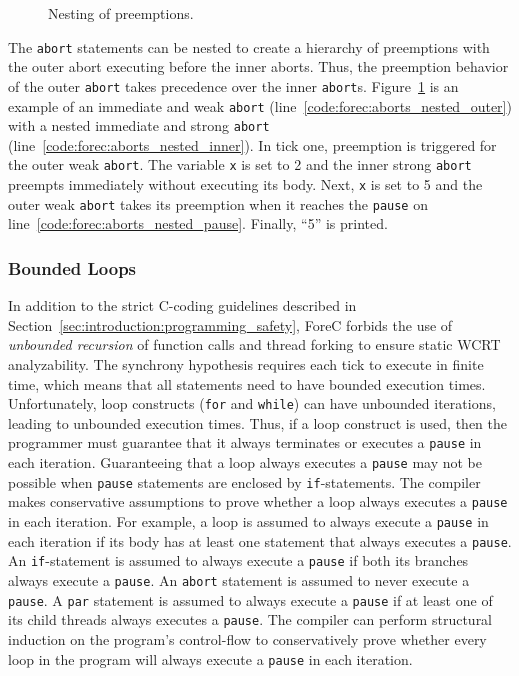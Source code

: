 \begin{figure}
	\centering

	\begin{minipage}[t]{0.65\columnwidth}
		
	\end{minipage}

	\caption{Nesting of preemptions.}
	\label{fig:forec:aborts_nested}
\end{figure}

The \verb$abort$ statements can be nested to create 
a hierarchy of preemptions with the outer abort executing 
before the inner aborts. Thus, the preemption 
behavior of the outer \verb$abort$ takes precedence 
over the inner \verb$abort$s. Figure~\ref{fig:forec:aborts_nested}
is an example of an immediate and weak
\verb$abort$ (line~\ref{code:forec:aborts_nested_outer}) 
with a nested immediate and strong \verb$abort$
(line~\ref{code:forec:aborts_nested_inner}).
In tick one, preemption is triggered for the outer
weak \verb$abort$. The variable \verb$x$ is set to 2
and the inner strong \verb$abort$ preempts
immediately without executing its body. Next, \verb$x$ is set to 5 and the 
outer weak \verb$abort$ takes its preemption when 
it reaches the \verb$pause$ on line~\ref{code:forec:aborts_nested_pause}. 
Finally, ``5'' is printed.



\subsubsection{Bounded Loops}
\label{sec:forec:programming}
In addition to the strict C-coding guidelines described in 
Section~\ref{sec:introduction:programming_safety}, 
ForeC forbids the use of \emph{unbounded recursion} of function calls and 
thread forking to ensure static WCRT analyzability. 
The synchrony hypothesis requires each tick to execute 
in finite time, which means that all statements 
need to have bounded execution times. Unfortunately, loop constructs 
(\verb$for$ and \verb$while$) can have unbounded iterations, leading to
unbounded execution times. Thus, if a loop construct is used, 
then the programmer must guarantee that it always terminates or executes
a \verb$pause$ in each iteration. 
Guaranteeing that a loop always executes a \verb$pause$ may not be 
possible when \verb$pause$ statements are enclosed by \verb$if$-statements. 
The compiler makes conservative assumptions to prove whether 
a loop always executes a \verb$pause$ in each iteration. For example, 
a loop is assumed to always execute a \verb$pause$ in each iteration if 
its body has at least one statement that always executes a \verb$pause$. 
An \verb$if$-statement is assumed to always execute a \verb$pause$ if both 
its branches always execute a \verb$pause$. An 
\verb$abort$ statement is assumed to never execute a \verb$pause$. A 
\verb$par$ statement is assumed to always execute a \verb$pause$ if at 
least one of its child threads always executes a \verb$pause$. The compiler
can perform structural induction on the program's control-flow to conservatively 
prove whether every loop in the program will always execute a \verb$pause$ 
in each iteration.

